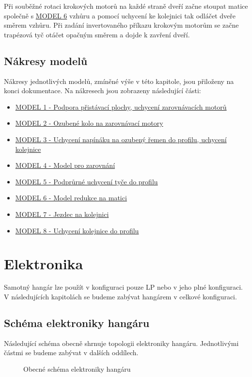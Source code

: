 \documentclass[a4paper]{article}
\begin{document}
    \noindent    
    Při souběžné rotaci krokových motorů na každé straně dveří začne stoupat matice společně s \hyperlink{dwg:6}{MODEL 6} vzhůru a pomocí uchycení ke kolejnici tak odláčet dveře směrem vzhůru. Při zadání invertovaného příkazu krokovým motorům se začne trapézová tyč otáčet opačným směrem a dojde k zavření dveří.\\
    
    \subsection{Nákresy modelů}\label{35-nuxe1kresy-modelux16f}
    Nákresy jednotlivých modelů, zmíněné výše v této kapitole, jsou přiloženy na konci dokumentace. Na nákresech jsou zobrazeny následující části:
    \begin{itemize}[noitemsep]
        \item \hyperlink{dwg:1}{MODEL 1 - Podpora přistávací plochy, uchycení zarovnávacích motorů}
        \item \hyperlink{dwg:2}{MODEL 2 - Ozubené kolo na zarovnávací motory}
        \item \hyperlink{dwg:2}{MODEL 3 - Uchycení napínáku na ozubený řemen do profilu, uchycení kolejnice}
        \item \hyperlink{dwg:2}{MODEL 4 - Model pro zarovnání}
        \item \hyperlink{dwg:2}{MODEL 5 - Podprůrné uchycení tyče do profilu}
        \item \hyperlink{dwg:2}{MODEL 6 - Model redukce na matici}
        \item \hyperlink{dwg:2}{MODEL 7 - Jezdec na kolejnici}
        \item \hyperlink{dwg:2}{MODEL 8 - Uchycení kolejnice do profilu}
    \end{itemize}    

\section{Elektronika} \label{sec:elektronika}
    Samotný hangár lze použít v konfiguraci pouze \acs{LP} nebo v jeho plné konfiguraci. V následujících kapitolách se budeme zabývat hangárem v celkové konfiguraci.
    
    \subsection{Schéma elektroniky hangáru}
    Následující schéma obecně shrnuje topologii elektroniky hangáru. Jednotlivými částmi se budeme zabývat v dalších oddílech.
    \begin{figure}[ht]
        \centering
        
        \caption{Obecné schéma elektroniky hangáru}
        \label{fig:el-gen-sch}
    \end{figure}
\end{document}
